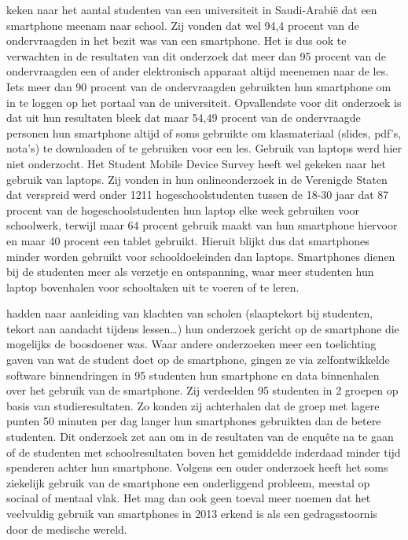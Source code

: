 \textcite{Alfawareh2014} keken naar het aantal studenten van een universiteit in Saudi-Arabië dat een smartphone meenam naar school. Zij vonden dat wel 94,4 procent van de ondervraagden in het bezit was van een smartphone. Het is dus ook te verwachten in de resultaten van dit onderzoek dat meer dan 95 procent van de ondervraagden een of ander elektronisch apparaat altijd meenemen naar de les. Iets meer dan 90 procent van de ondervraagden gebruikten hun smartphone om in te loggen op het portaal van de universiteit. Opvallendste voor dit onderzoek is dat uit hun resultaten bleek dat maar 54,49 procent van de ondervraagde personen hun smartphone altijd of soms gebruikte om klasmateriaal (slides, pdf’s, nota’s) te downloaden of te gebruiken voor een les. Gebruik van laptops werd hier niet onderzocht. Het Student Mobile Device Survey \autocite{Harris2015} heeft wel gekeken naar het gebruik van laptops. Zij vonden in hun onlineonderzoek in de Verenigde Staten dat verspreid werd onder 1211 hogeschoolstudenten tussen de 18-30 jaar dat 87 procent van de hogeschoolstudenten hun laptop elke week gebruiken voor schoolwerk, terwijl maar 64 procent gebruik maakt van hun smartphone hiervoor en maar 40 procent een tablet gebruikt. Hieruit blijkt dus dat smartphones minder worden gebruikt voor schooldoeleinden dan laptops. Smartphones dienen bij de studenten meer als verzetje en ontspanning, waar meer studenten hun laptop bovenhalen voor schooltaken uit te voeren of te leren.

\textcite{Lee2014} hadden naar aanleiding van klachten van scholen (slaaptekort bij studenten, tekort aan aandacht tijdens lessen…) hun onderzoek gericht op de smartphone die mogelijks de boosdoener was. Waar andere onderzoeken meer een toelichting gaven van wat de student doet op de smartphone, gingen ze via zelfontwikkelde software binnendringen in 95 studenten hun smartphone en data binnenhalen over het gebruik van de smartphone. Zij verdeelden 95 studenten in 2 groepen op basis van studieresultaten. Zo konden zij achterhalen dat de groep met lagere punten 50 minuten per dag langer hun smartphones gebruikten dan de betere studenten. Dit onderzoek zet aan om in de resultaten van de enquête na te gaan of de studenten met schoolresultaten boven het gemiddelde inderdaad minder tijd spenderen achter hun smartphone.
Volgens een ouder onderzoek \autocite{Morahan-Martin1999} heeft het soms ziekelijk gebruik van de smartphone een onderliggend probleem, meestal op sociaal of mentaal vlak. Het mag dan ook geen toeval meer noemen dat het veelvuldig gebruik van smartphones in 2013 erkend is als een gedragsstoornis door de medische wereld.  

